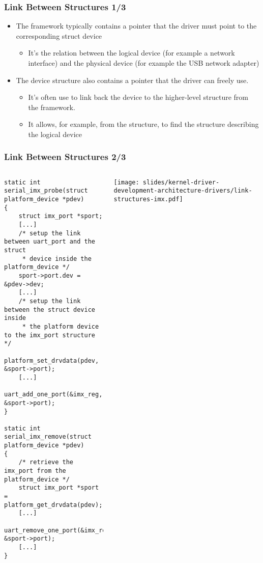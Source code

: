 \begin{frame}
  \frametitle{Link Between Structures 1/3}
  \begin{itemize}
  \item The framework typically contains a 
    pointer that the driver must point to the corresponding struct
    device
    \begin{itemize}
    \item It's the relation between the logical device (for example a
      network interface) and the physical device (for example the USB
      network adapter)
    \end{itemize}
  \item The device structure also contains a  pointer
    that the driver can freely use.
    \begin{itemize}
    \item It's often use to link back the device to the higher-level
      structure from the framework.
    \item It allows, for example, from the 
      structure, to find the structure describing the logical device
    \end{itemize}
  \end{itemize}
\end{frame}

\begin{frame}[fragile]
  \frametitle{Link Between Structures 2/3}
  \begin{columns}
    \begin{verbatim}
static int serial_imx_probe(struct platform_device *pdev)
{
    struct imx_port *sport;
    [...]
    /* setup the link between uart_port and the struct
     * device inside the platform_device */
    sport->port.dev = &pdev->dev;
    [...]
    /* setup the link between the struct device inside
     * the platform device to the imx_port structure */
    platform_set_drvdata(pdev, &sport->port);
    [...]
    uart_add_one_port(&imx_reg, &sport->port);
}

static int serial_imx_remove(struct platform_device *pdev)
{
    /* retrieve the imx_port from the platform_device */
    struct imx_port *sport = platform_get_drvdata(pdev);
    [...]
    uart_remove_one_port(&imx_reg, &sport->port);
    [...]
}
    \end{verbatim}
    \begin{center}
      \texttt{[image: slides/kernel-driver-development-architecture-drivers/link-structures-imx.pdf]}
    \end{center}
  \end{columns}
\end{frame}

